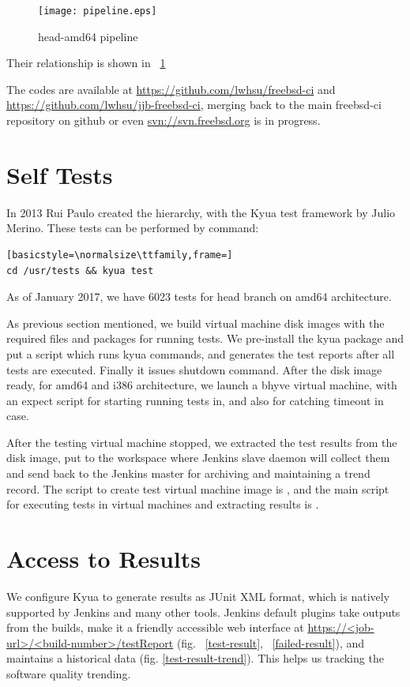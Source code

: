 \documentclass[a4paper,twocolumn,10pt]{article}
\begin{document}
\begin{figure}
\texttt{[image: pipeline.eps]}
\caption{head-amd64 pipeline}
\label{pipeline}
\end{figure}

Their relationship is shown in ~\ref{pipeline}

The codes are available at \url{https://github.com/lwhsu/freebsd-ci} and
\url{https://github.com/lwhsu/jjb-freebsd-ci}, merging back to the main
freebsd-ci repository on github or even \url{svn://svn.freebsd.org} is in
progress.

\section{Self Tests}

In 2013 Rui Paulo created the  hierarchy, with the Kyua
\cite{kyua} test framework by Julio Merino. These tests can be performed by
command:
\begin{lstlisting}[basicstyle=\normalsize\ttfamily,frame=]
cd /usr/tests && kyua test
\end{lstlisting}
As of January 2017, we have 6023 tests for head branch on amd64 architecture.

As previous section mentioned, we build virtual machine disk images with the
required files and packages for running tests. We pre-install the kyua package
and put a script which runs kyua commands, and generates the test reports after
all tests are executed. Finally it issues shutdown command. After the disk
image ready, for amd64 and i386 architecture, we launch a bhyve \cite{bhyve}
virtual machine, with an expect script for starting running tests in, and also
for catching timeout in case.

After the testing virtual machine stopped, we extracted the test results from
the disk image, put to the workspace where Jenkins slave daemon will collect them and
send back to the Jenkins master for archiving and maintaining a trend record.
The script to create test virtual machine image is
, and the main script for executing
tests in virtual machines and extracting results is
.

\section{Access to Results}

We configure Kyua to generate results as JUnit \cite{junit} XML format, which
is natively supported by Jenkins and many other tools. Jenkins default plugins
take outputs from the builds, make it a friendly accessible web interface at
\url{https://<job-url>/<build-number>/testReport} (fig. ~\ref{test-result},
~\ref{failed-result}), and maintains a historical data (fig.
\ref{test-result-trend}). This helps us tracking the software quality trending.
\end{document}
